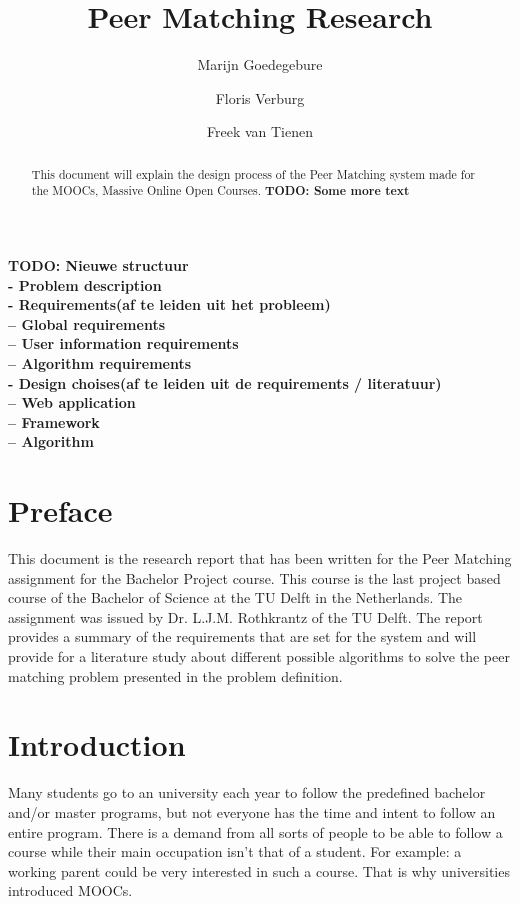 \documentclass[]{article}
\title{Peer Matching Research}
\author{Marijn Goedegebure \and
	Floris Verburg \and
	Freek van Tienen}
\date{}
\newcommand{\TODO}[1]{{\color{red}\textbf{TODO: #1}}}
\begin{document}
\maketitle

\begin{abstract}
This document will explain the design process of the Peer Matching system made for the MOOCs, Massive Online Open Courses.
\TODO{Some more text}
\end{abstract}

\TODO{
Nieuwe structuur\\
- Problem description\\
- Requirements(af te leiden uit het probleem)\\
-- Global requirements\\
-- User information requirements\\
-- Algorithm requirements\\
- Design choises(af te leiden uit de requirements / literatuur)\\
-- Web application\\
-- Framework\\
-- Algorithm\\}

\newpage

\tableofcontents

\newpage

\section{Preface}
This document is the research report that has been written for the Peer Matching assignment for the Bachelor Project course.
This course is the last project based course of the Bachelor of Science at the TU Delft in the Netherlands. The assignment was issued by Dr. L.J.M. Rothkrantz of the TU Delft.
The report provides a summary of the requirements that are set for the system and will provide for a literature study about different possible algorithms to solve the peer matching problem presented in the problem definition.

\section{Introduction}
Many students go to an university each year to follow the predefined bachelor and/or master programs, but not everyone has the time and intent to follow an entire program.
There is a demand from all sorts of people to be able to follow a course while their main occupation isn't that of a student.
For example: a working parent could be very interested in such a course.
That is why universities introduced MOOCs.
\end{document}
